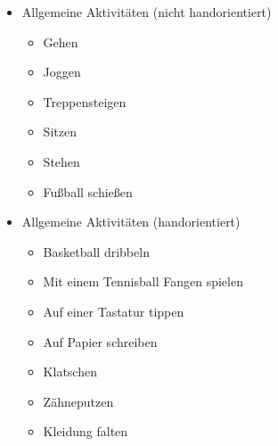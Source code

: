 \begin{figure}
    \smaller 
    \centering
    \begin{itemize}
        \item Allgemeine Aktivitäten (nicht handorientiert)
        \begin{itemize} \item Gehen \end{itemize}
        \begin{itemize} \item Joggen \end{itemize}
        \begin{itemize} \item Treppensteigen \end{itemize}
        \begin{itemize} \item Sitzen \end{itemize}
        \begin{itemize} \item Stehen \end{itemize}
        \begin{itemize} \item Fußball schießen \end{itemize}
        \item Allgemeine Aktivitäten (handorientiert)
        \begin{itemize} \item Basketball dribbeln \end{itemize}
        \begin{itemize} \item Mit einem Tennisball Fangen spielen \end{itemize}
        \begin{itemize} \item Auf einer Tastatur tippen \end{itemize}
        \begin{itemize} \item Auf Papier schreiben \end{itemize}
        \begin{itemize} \item Klatschen \end{itemize}
        \begin{itemize} \item Zähneputzen \end{itemize}
        \begin{itemize} \item Kleidung falten \end{itemize}

\end{itemize}
\end{figure}
